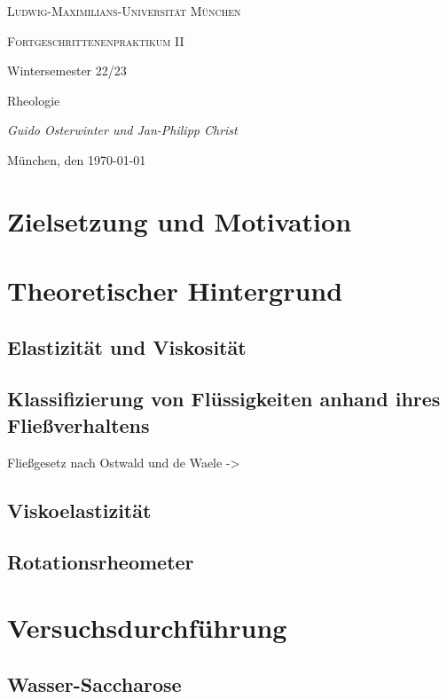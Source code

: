 \documentclass[11pt,a4paper,oneside]{scrartcl}
\begin{document}
\begin{titlepage}
	\centering
	{\scshape\LARGE Ludwig-Maximilians-Universität \linebreak München \par}
	\vspace{1cm}
	{\scshape\Large Fortgeschrittenenpraktikum II \par Wintersemester 22/23 \par}
	\vspace{1.5cm}
	{\huge\bfseries \par  Rheologie\par}
	\vspace{2cm}
	{\Large\itshape Guido Osterwinter und Jan-Philipp Christ \par}
	\vfill
	{\large München, den \today\par}
\end{titlepage}

\tableofcontents
\newpage
\section{Zielsetzung und Motivation}

\section{Theoretischer Hintergrund}
\subsection{Elastizität und Viskosität}
\subsection{Klassifizierung von Flüssigkeiten anhand ihres Fließverhaltens}
Fließgesetz nach Ostwald und de Waele ->\cite{dewiki:192899581}
\subsection{Viskoelastizität}
\subsection{Rotationsrheometer}
\section{Versuchsdurchführung}
\subsection{Wasser-Saccharose}
\end{document}
